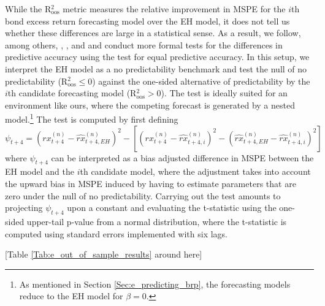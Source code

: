 \documentclass[12pt,letterpaper,leqno,doublespacing]{article}
\begin{document}
While the R$^{2}_{\text{oos}}$ metric measures the relative improvement in MSPE for the $i$th bond excess return forecasting model over the EH model, it does not tell us whether these differences are large in a statistical sense. As a result, we follow, among others, \cite{RapachZhou2013}, \cite{GarganoPettenuzzoTimmermann2014}, and \cite{AndreasenEngstedMoellerSander2014} and conduct more formal tests for the differences in predictive accuracy using the \cite{ClarkWest2007} test for equal predictive accuracy. In this setup, we interpret the EH model as a no predictability benchmark and test the null of no predictability (R$^{2}_{\text{oos}} \leq 0$) against the one-sided alternative of predictability by the $i$th candidate forecasting model (R$^{2}_{\text{oos}} > 0$). The \cite{ClarkWest2007} test is ideally suited for an environment like ours, where the competing forecast is generated by a nested model.\footnote{As mentioned in Section \ref{Sec:e_predicting_brp}, the forecasting models reduce to the EH model for $\beta = 0$.} The test is computed by first defining 
\begin{equation}
    \psi_{t+4} = \left(rx_{t+4}^{\left(n\right)} - \widehat{rx}_{t+4,EH}^{\left(n\right)}\right)^{2} - \left[\left(rx_{t+4}^{\left(n\right)} - \widehat{rx}_{t+4,i}^{\left(n\right)}\right)^{2} - \left(\widehat{rx}_{t+4,EH}^{\left(n\right)}-\widehat{rx}_{t+4,i}^{\left(n\right)}\right)^{2}\right]
    \label{eq:e_clark_west}
\end{equation}
where $\psi_{t+4}$ can be interpreted as a bias adjusted difference in MSPE between the EH model and the $i$th candidate model, where the adjustment takes into account the upward bias in MSPE induced by having to estimate parameters that are zero under the null of no predictability. Carrying out the test amounts to projecting $\psi_{t+4}$ upon a constant and evaluating the t-statistic using the one-sided upper-tail p-value from a normal distribution, where the t-statistic is computed using \cite{NeweyWest1987} standard errors implemented with six lags.

\begin{center}
    [Table \ref{Tab:e_out_of_sample_results} around here]
\end{center}
\end{document}
